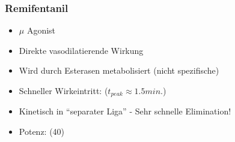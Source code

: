 \mode*

\begin{frame}
\frametitle{Remifentanil}
\begin{itemize}[<+->]
\item
$\mu$ Agonist
\item
Direkte vasodilatierende Wirkung
\item
Wird durch Esterasen metabolisiert (nicht spezifische)
\item
Schneller Wirkeintritt: ($t_{peak} \approx 1.5 min.$)
\item
Kinetisch in \enquote{separater Liga} - Sehr schnelle Elimination!
\item 
Potenz: (40)
\end{itemize}
\infina
\end{frame}

